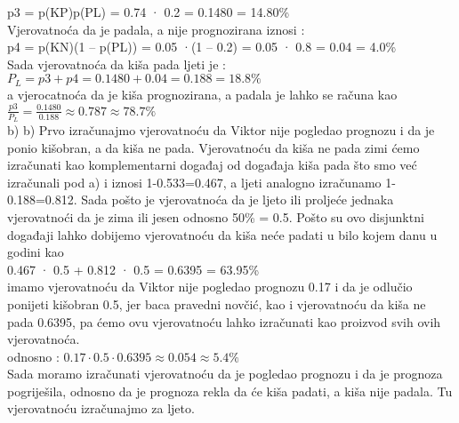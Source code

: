 \documentclass[12pt]{article}
\begin{document}
\begin{enumerate}
\begin{center}
{p3 = p(KP)p(PL) = 0.74 · 0.2 = 0.1480 = 14.80\%
\\ \vspace{0.25cm}
Vjerovatnoća da je padala, a nije prognozirana iznosi :
\\ \vspace{0.15cm}
p4 = p(KN)(1 – p(PL)) = 0.05 ·(1 – 0.2) = 0.05 · 0.8 = 0.04 = 4.0\%
\\ \vspace{0.25cm}
Sada vjerovatnoća da kiša pada ljeti je : \\ \vspace{0.15cm}
$ P_L= p3 + p4 = 0.1480 + 0.04 = 0.188 = 18.8\%$
\\ \vspace{0.25cm}
a vjerocatnoća da je kiša prognozirana, a padala je lahko se računa kao
\\ \vspace{0.25cm}
$\frac{p3}{P_L} = \frac{0.1480}{0.188} \approx 0.787 \approx 78.7\%$
\\ \vspace{0.25cm}
b) b) Prvo izračunajmo vjerovatnoću da Viktor nije pogledao prognozu i da
je ponio kišobran, a da kiša ne pada. Vjerovatnoću da kiša ne pada zimi ćemo
izračunati kao komplementarni događaj od događaja kiša pada što smo već izračunali pod a) i iznosi
1-0.533=0.467, a ljeti analogno izračunamo 1-0.188=0.812. Sada pošto je
vjerovatnoća da je ljeto ili proljeće jednaka vjerovatnoći da je zima ili jesen
odnosno 50\% = 0.5. Pošto su ovo disjunktni događaji lahko dobijemo
vjerovatnoću da kiša neće padati u bilo kojem danu u godini kao
\\ \vspace{0.25cm}
0.467 · 0.5 + 0.812 · 0.5 = 0.6395 = 63.95\%
\\ \vspace{0.25cm}
 imamo vjerovatnoću da Viktor nije pogledao prognozu 0.17 i da
je odlučio ponijeti kišobran 0.5, jer baca pravedni novčić, kao i vjerovatnoću da kiša ne pada 0.6395, pa ćemo ovu vjerovatnoću lahko izračunati kao proizvod svih ovih vjerovatnoća. \\ \vspace{0.15cm}
odnosno : $0.17 \cdot 0.5 \cdot 0.6395 \approx 0.054 \approx 5.4\% $
\\ \vspace{0.25cm}
Sada moramo izračunati vjerovatnoću da je pogledao prognozu i da je
prognoza pogriješila, odnosno da je prognoza rekla da će kiša padati, a kiša nije
padala. Tu vjerovatnoću izračunajmo za ljeto.
\\ \vspace{0.25cm}
}
\end{center}
\end{enumerate}
\end{document}
